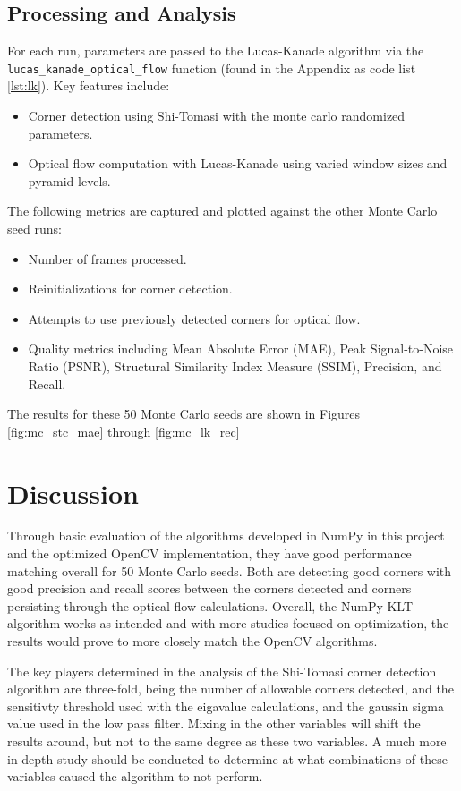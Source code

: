 \documentclass[11pt, conference, letterpaper]{IEEEtran}
\begin{document}
\subsection{Processing and Analysis}

For each run, parameters are passed to the Lucas-Kanade algorithm via the \texttt{lucas\_kanade\_optical\_flow} function (found in the Appendix as code list \ref{lst:lk}). Key features include:
\begin{itemize}
    \item Corner detection using Shi-Tomasi with the monte carlo randomized parameters.
    \item Optical flow computation with Lucas-Kanade using varied window sizes and pyramid levels.
\end{itemize}

The following metrics are captured and plotted against the other Monte Carlo seed runs:
\begin{itemize}
    \item Number of frames processed.
    \item Reinitializations for corner detection.
    \item Attempts to use previously detected corners for optical flow.
    \item Quality metrics including Mean Absolute Error (MAE), Peak Signal-to-Noise Ratio (PSNR), Structural Similarity Index Measure (SSIM), Precision, and Recall.
\end{itemize}

The results for these 50 Monte Carlo seeds are shown in Figures \ref{fig:mc_stc_mae} through \ref{fig:mc_lk_rec}

\section{Discussion}
Through basic evaluation of the algorithms developed in NumPy in this project and the optimized OpenCV implementation, they have good performance matching overall for 50 Monte Carlo seeds. Both are detecting good corners with good precision and recall scores between the corners detected and corners persisting through the optical flow calculations. Overall, the NumPy KLT algorithm works as intended and with more studies focused on optimization, the results would prove to more closely match the OpenCV algorithms.

The key players determined in the analysis of the Shi-Tomasi corner detection algorithm are three-fold, being the number of allowable corners detected, and the sensitivty threshold used with the eigavalue calculations, and the gaussin sigma value used in the low pass filter. Mixing in the other variables will shift the results around, but not to the same degree as these two variables. A much more in depth study should be conducted to determine at what combinations of these variables caused the algorithm to not perform.
\end{document}
